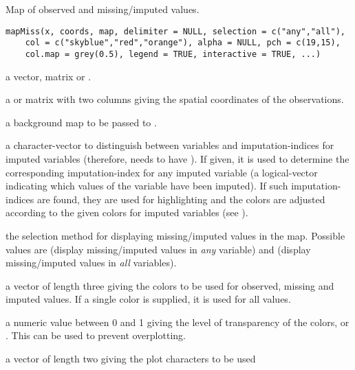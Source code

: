 %
\begin{Description}\relax
Map of observed and missing/imputed values.
\end{Description}
%
\begin{Usage}
\begin{verbatim}
mapMiss(x, coords, map, delimiter = NULL, selection = c("any","all"), 
    col = c("skyblue","red","orange"), alpha = NULL, pch = c(19,15),
    col.map = grey(0.5), legend = TRUE, interactive = TRUE, ...)
\end{verbatim}
\end{Usage}
%
\begin{Arguments}
\begin{ldescription}
\item[\code{x}] a vector, matrix or .
\item[\code{coords}] a  or matrix with two columns giving 
the spatial coordinates of the observations.
\item[\code{map}] a background map to be passed to .
\item[\code{delimiter}] a character-vector to distinguish between variables
and imputation-indices for imputed variables (therefore,  needs
to have ). If given, it is used to determine the corresponding
imputation-index for any imputed variable (a logical-vector indicating
which values of the variable have been imputed). If such imputation-indices
are found, they are used for highlighting and the colors are adjusted 
according to the given colors for imputed variables (see ).
\item[\code{selection}] the selection method for displaying missing/imputed values in 
the map.  Possible values are  (display missing/imputed values in 
\emph{any} variable) and  (display missing/imputed values in 
\emph{all} variables).
\item[\code{col}] a vector of length three giving the colors to be used for 
observed, missing and imputed values.  If a single color is supplied, it 
is used for all values.
\item[\code{alpha}] a numeric value between 0 and 1 giving the level of 
transparency of the colors, or .  This can be used to
prevent overplotting.
\item[\code{pch}] a vector of length two giving the plot characters to be used 

\end{ldescription}
\end{Arguments}
